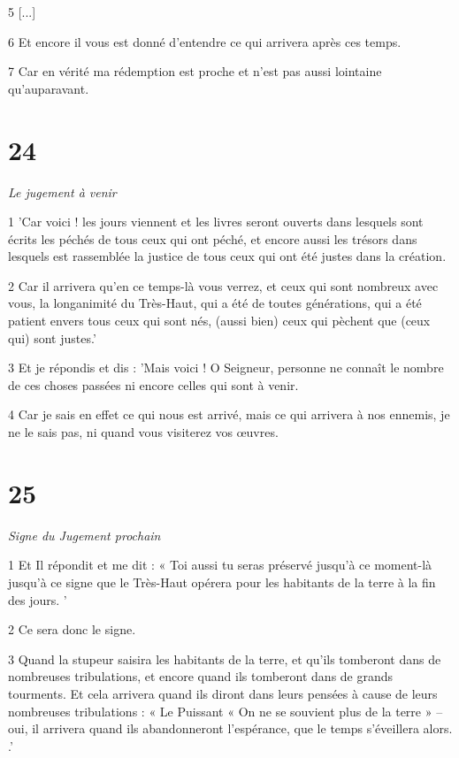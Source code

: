 \par 5 [...]

\par 6 Et encore il vous est donné d'entendre ce qui arrivera après ces temps.

\par 7 Car en vérité ma rédemption est proche et n'est pas aussi lointaine qu'auparavant.

\chapter{24}

\par \textit{Le jugement à venir}

\par 1 'Car voici ! les jours viennent et les livres seront ouverts dans lesquels sont écrits les péchés de tous ceux qui ont péché, et encore aussi les trésors dans lesquels est rassemblée la justice de tous ceux qui ont été justes dans la création.

\par 2 Car il arrivera qu'en ce temps-là vous verrez, et ceux qui sont nombreux avec vous, la longanimité du Très-Haut, qui a été de toutes générations, qui a été patient envers tous ceux qui sont nés, (aussi bien) ceux qui pèchent que (ceux qui) sont justes.'

\par 3 Et je répondis et dis : 'Mais voici ! O Seigneur, personne ne connaît le nombre de ces choses passées ni encore celles qui sont à venir.

\par 4 Car je sais en effet ce qui nous est arrivé, mais ce qui arrivera à nos ennemis, je ne le sais pas, ni quand vous visiterez vos œuvres.

\chapter{25}

\par \textit{Signe du Jugement prochain}

\par 1 Et Il répondit et me dit : « Toi aussi tu seras préservé jusqu'à ce moment-là jusqu'à ce signe que le Très-Haut opérera pour les habitants de la terre à la fin des jours. '

\par 2 Ce sera donc le signe.

\par 3 Quand la stupeur saisira les habitants de la terre, et qu'ils tomberont dans de nombreuses tribulations, et encore quand ils tomberont dans de grands tourments. Et cela arrivera quand ils diront dans leurs pensées à cause de leurs nombreuses tribulations : « Le Puissant « On ne se souvient plus de la terre » – oui, il arrivera quand ils abandonneront l’espérance, que le temps s’éveillera alors. .'

